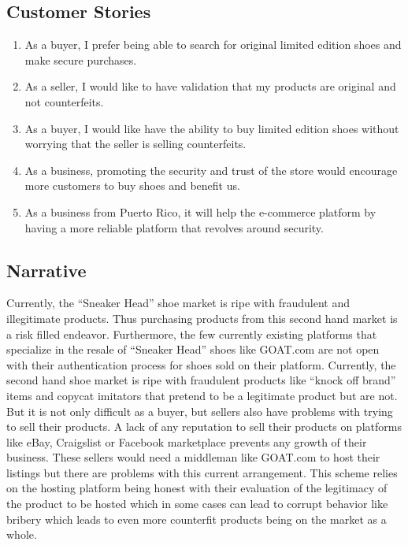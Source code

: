 \subsection{Customer Stories}
\begin{enumerate}
  \item As a buyer, I prefer being able to search for original limited edition shoes and make secure purchases.
  \item As a seller, I would like to have validation that my products are original and not counterfeits.
  \item As a buyer, I would like have the ability to buy limited edition shoes without worrying that the seller is selling counterfeits.
  \item As a business, promoting the security and trust of the store would encourage more customers to buy shoes and benefit us.
  \item As a business from Puerto Rico, it will help the e-commerce platform by having a more reliable platform that revolves around security.
\end{enumerate}
\subsection{Narrative}
\hspace{1cm} Currently, the ``Sneaker Head'' shoe market is ripe with fraudulent and illegitimate products. Thus purchasing products from this second hand market is a risk filled endeavor. Furthermore, the few currently existing platforms that specialize in the resale of ``Sneaker Head'' shoes like GOAT.com are not open with their authentication process for shoes sold on their platform. Currently, the second hand shoe market is ripe with fraudulent products like ``knock off brand'' items and copycat imitators that pretend to be a legitimate product but are not. But it is not only difficult as a buyer, but sellers also have problems with trying to sell their products. A lack of any reputation to sell their products on platforms like eBay, Craigslist or Facebook marketplace prevents any growth of their business. These sellers would need a middleman like GOAT.com to host their listings but there are problems with this current arrangement. This scheme relies on the hosting platform being honest with their evaluation of the legitimacy of the product to be hosted which in some cases can lead to corrupt behavior like bribery which leads to even more counterfit products being on the market as a whole.
